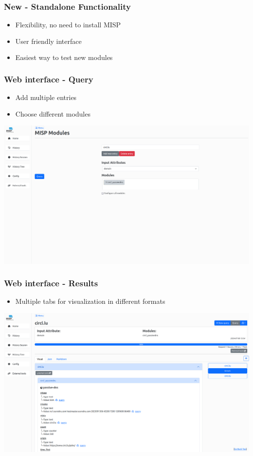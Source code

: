 \begin{frame}[fragile]
    \frametitle{New - Standalone Functionality}
    \begin{itemize}
        \item Flexibility, no need to install MISP
        \item User friendly interface
        \item Easiest way to test new modules
    \end{itemize}
\end{frame}

\begin{frame}[fragile]
    \frametitle{Web interface - Query}
    \begin{itemize}
        \item Add multiple entries
        \item Choose different modules
    \end{itemize}
    \includegraphics[scale=0.23]{screenshots/misp_module_index.png}
\end{frame}

\begin{frame}[fragile]
    \frametitle{Web interface - Results}
    \begin{itemize}
        \item Multiple tabs for visualization in different formats
    \end{itemize}
    \includegraphics[scale=0.23]{screenshots/misp_module_results.png}
\end{frame}

